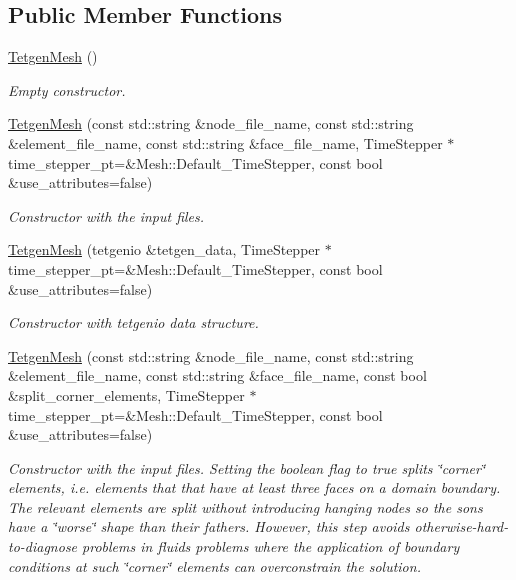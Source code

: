 \subsection*{Public Member Functions}
\begin{DoxyCompactItemize}
\item 
\hyperlink{classoomph_1_1TetgenMesh_a2d2c7796e578f9fed1faf17569893531}{Tetgen\+Mesh} ()
\begin{DoxyCompactList}\small\item\em Empty constructor. \end{DoxyCompactList}\item 
\hyperlink{classoomph_1_1TetgenMesh_a10976b817c361f04da4ce996bd019c02}{Tetgen\+Mesh} (const std\+::string \&node\+\_\+file\+\_\+name, const std\+::string \&element\+\_\+file\+\_\+name, const std\+::string \&face\+\_\+file\+\_\+name, Time\+Stepper $\ast$time\+\_\+stepper\+\_\+pt=\&Mesh\+::\+Default\+\_\+\+Time\+Stepper, const bool \&use\+\_\+attributes=false)
\begin{DoxyCompactList}\small\item\em Constructor with the input files. \end{DoxyCompactList}\item 
\hyperlink{classoomph_1_1TetgenMesh_ace863f736d0dfa0a059b28959fced51d}{Tetgen\+Mesh} (tetgenio \&tetgen\+\_\+data, Time\+Stepper $\ast$time\+\_\+stepper\+\_\+pt=\&Mesh\+::\+Default\+\_\+\+Time\+Stepper, const bool \&use\+\_\+attributes=false)
\begin{DoxyCompactList}\small\item\em Constructor with tetgenio data structure. \end{DoxyCompactList}\item 
\hyperlink{classoomph_1_1TetgenMesh_a867b3f70bd0f5063901720d04f28e95e}{Tetgen\+Mesh} (const std\+::string \&node\+\_\+file\+\_\+name, const std\+::string \&element\+\_\+file\+\_\+name, const std\+::string \&face\+\_\+file\+\_\+name, const bool \&split\+\_\+corner\+\_\+elements, Time\+Stepper $\ast$time\+\_\+stepper\+\_\+pt=\&Mesh\+::\+Default\+\_\+\+Time\+Stepper, const bool \&use\+\_\+attributes=false)
\begin{DoxyCompactList}\small\item\em Constructor with the input files. Setting the boolean flag to true splits \char`\"{}corner\char`\"{} elements, i.\+e. elements that that have at least three faces on a domain boundary. The relevant elements are split without introducing hanging nodes so the sons have a \char`\"{}worse\char`\"{} shape than their fathers. However, this step avoids otherwise-\/hard-\/to-\/diagnose problems in fluids problems where the application of boundary conditions at such \char`\"{}corner\char`\"{} elements can overconstrain the solution. \end{DoxyCompactList}\item 

\end{DoxyCompactItemize}
